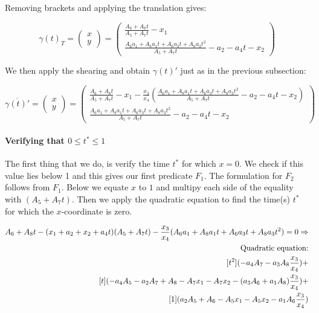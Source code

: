 \documentclass[UKenglish]{lipics-v2019}
\begin{document}
Removing brackets and applying the translation gives:

  \begin{equation*}
   \gamma(t)_T = \left( \begin{array}{c}
         x  \\
         y 
    \end{array}  \right) = 
    \left( \begin{array}{c}
         \frac{ A_6 + A_8 t}
      { A_5  + A_7 t } - x_1 \\
         \frac{ A_6 a_1 + A_8 a_1 t + A_6 a_3 t + A_8 a_3 t^2 }{A_5 + A_7t} - a_2 - a_4 t - x_2
    \end{array}  \right)
  \end{equation*}
  
We then apply the shearing and obtain $\gamma(t)'$ just as in the previous subsection:

\begin{equation*}
   \overline{\gamma(t)'} = \left( \begin{array}{c}
         x  \\
         y 
    \end{array}  \right) = 
    \left( \begin{array}{c}
       \frac{ A_6 + A_8 t}
      { A_5  + A_7 t } - x_1 - \frac{x_3}{x_4} \left( \frac{ A_6 a_1 + A_8 a_1 t + A_6 a_3 t + A_8 a_3 t^2 }{A_5 + A_7t} - a_2 - a_4 t - x_2 \right)  \\
         \frac{ A_6 a_1 + A_8 a_1 t + A_6 a_3 t + A_8 a_3 t^2 }{A_5 + A_7t} - a_2 - a_4 t - x_2
    \end{array}  \right)
\end{equation*}

\paragraph*{Verifying that $0 \le t^* \le 1$}

The first thing that we do, is verify the time $t^*$ for which $x=0$. We check if this value lies below 1 and this gives our first predicate $F_1$. The formulation for $F_2$ follows from $F_1$. Below we equate $x$ to $1$ and  multipy each side of the equality with $(A_5 + A_7 t)$. Then we apply the quadratic equation to find the time(s) $t^*$ for which the $x$-coordinate is zero.

\begin{align*}
     A_6 + A_8 t - (x_1 + a_2 + x_2 + a_4t)(A_5 + A_7 t) - \frac{x_3}{x_4} (A_6 a_1 + A_8 a_1 t + A_6 a_3 t + A_8 a_3 t^2) = 0  \Rightarrow \\
     \textnormal{Quadratic equation:} \\
     [t^2](- a_4 A_7 - a_3 A_8 \frac{x_3}{x_4}) + \\
     [t] (- a_4A_5 - a_2A_7+ A_8- A_7 x_1 - A_7 x_2 - (a_3A_6 + a_1 A_8)\frac{x_3}{x_4}) + \\
     [1] (a_2 A_5 + A_6- A_5x_1  - A_5x_2  - a_1A_6 \frac{x_3}{x_4})
\end{align*}
\end{document}
